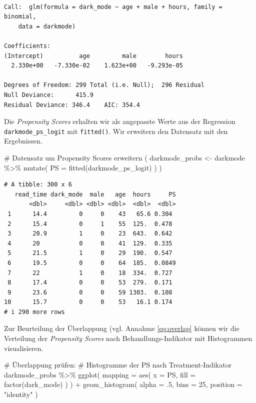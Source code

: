 \documentclass[
  a4paper,
  DIV=11,
  oneside]{scrreprt}
\newenvironment{Shaded}{\begin{snugshade}}{\end{snugshade}}
\newcommand{\AttributeTok}[1]{\textcolor[rgb]{0.40,0.45,0.13}{#1}}
\newcommand{\CommentTok}[1]{\textcolor[rgb]{0.37,0.37,0.37}{#1}}
\newcommand{\DecValTok}[1]{\textcolor[rgb]{0.68,0.00,0.00}{#1}}
\newcommand{\FunctionTok}[1]{\textcolor[rgb]{0.28,0.35,0.67}{#1}}
\newcommand{\NormalTok}[1]{\textcolor[rgb]{0.00,0.23,0.31}{#1}}
\newcommand{\OtherTok}[1]{\textcolor[rgb]{0.00,0.23,0.31}{#1}}
\newcommand{\SpecialCharTok}[1]{\textcolor[rgb]{0.37,0.37,0.37}{#1}}
\newcommand{\StringTok}[1]{\textcolor[rgb]{0.13,0.47,0.30}{#1}}
\begin{document}
\begin{verbatim}

Call:  glm(formula = dark_mode ~ age + male + hours, family = binomial, 
    data = darkmode)

Coefficients:
(Intercept)          age         male        hours  
  2.330e+00   -7.330e-02    1.623e+00   -9.293e-05  

Degrees of Freedom: 299 Total (i.e. Null);  296 Residual
Null Deviance:      415.9 
Residual Deviance: 346.4    AIC: 354.4
\end{verbatim}

Die \emph{Propensity Scores} erhalten wir als angepasste Werte aus der
Regression \texttt{darkmode\_ps\_logit} mit \texttt{fitted()}. Wir
erweitern den Datensatz mit den Ergebnissen.

\begin{Shaded}
\begin{Highlighting}[]
\CommentTok{\# Datensatz um Propensity Scores erweitern}
\NormalTok{(}
\NormalTok{  darkmode\_probs }\OtherTok{\textless{}{-}} 
\NormalTok{    darkmode }\SpecialCharTok{\%\textgreater{}\%}
    \FunctionTok{mutate}\NormalTok{(}
      \AttributeTok{PS =} \FunctionTok{fitted}\NormalTok{(darkmode\_ps\_logit)}
\NormalTok{    )}
\NormalTok{)}
\end{Highlighting}
\end{Shaded}

\begin{verbatim}
# A tibble: 300 x 6
   read_time dark_mode  male   age  hours     PS
       <dbl>     <dbl> <dbl> <dbl>  <dbl>  <dbl>
 1      14.4         0     0    43   65.6 0.304 
 2      15.4         0     1    55  125.  0.478 
 3      20.9         1     0    23  643.  0.642 
 4      20           0     0    41  129.  0.335 
 5      21.5         1     0    29  190.  0.547 
 6      19.5         0     0    64  185.  0.0849
 7      22           1     0    18  334.  0.727 
 8      17.4         0     0    53  279.  0.171 
 9      23.6         0     0    59 1303.  0.108 
10      15.7         0     0    53   16.1 0.174 
# i 290 more rows
\end{verbatim}

Zur Beurteilung der Überlappung (vgl. Annahme \eqref{eq:overlap} können
wir die Verteilung der \emph{Propensity Scores} nach
Behandlungs-Indikator mit Histogrammen visualisieren.

\begin{Shaded}
\begin{Highlighting}[]
\CommentTok{\# Überlappung prüfen:}
\CommentTok{\# Histogramme der PS nach Treatment{-}Indikator}
\NormalTok{darkmode\_probs }\SpecialCharTok{\%\textgreater{}\%}
  \FunctionTok{ggplot}\NormalTok{(}
    \AttributeTok{mapping =} \FunctionTok{aes}\NormalTok{(}
      \AttributeTok{x =}\NormalTok{ PS, }
      \AttributeTok{fill =} \FunctionTok{factor}\NormalTok{(dark\_mode)}
\NormalTok{    )}
\NormalTok{  ) }\SpecialCharTok{+} 
  \FunctionTok{geom\_histogram}\NormalTok{(}
    \AttributeTok{alpha =}\NormalTok{ .}\DecValTok{5}\NormalTok{, }
    \AttributeTok{bins =} \DecValTok{25}\NormalTok{, }
    \AttributeTok{position =} \StringTok{"identity"}
\NormalTok{  )}
\end{Highlighting}
\end{Shaded}
\end{document}
